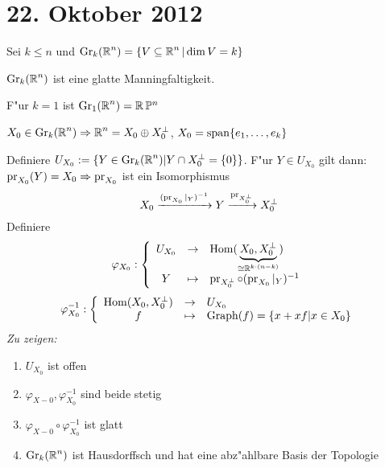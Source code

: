 \section{22. Oktober 2012}
\setcounter{Aufg}{0} %
\setcounter{Loes}{0}

\begin{Dfn*}
Sei $k \le n$ und $\operatorname{Gr}_k(\operatorname{\mathbb{R}}^n) = \{ V \subseteq \operatorname{\mathbb{R}}^n | \operatorname{dim} V = k\}$
\end{Dfn*}

\begin{beh*}
$\operatorname{Gr}_k(\operatorname{\mathbb{R}}^n)$ ist eine glatte Manningfaltigkeit.
\end{beh*}

\begin{Bem*}
F"ur $k = 1$ ist $\operatorname{Gr}_1(\operatorname{\mathbb{R}}^n) = \operatorname{\mathbb{R}} \mathbb{P}^n$
\end{Bem*}

$X_0 \in \operatorname{Gr}_k(\operatorname{\mathbb{R}}^n) \Rightarrow \operatorname{\mathbb{R}}^n = X_0 \oplus X_0^\perp$, $X_0 = \operatorname{span}\{e_1,\ldots ,e_k\}$ 

Definiere $U_{X_0} := \{Y \in \operatorname{Gr}_k(\operatorname{\mathbb{R}}^n) | Y \cap X_0^\perp = \{0\}\}$. F"ur $Y \in U_{X_0}$ gilt dann: $\operatorname{pr}_{X_0}(Y) = X_0 \Rightarrow \operatorname{pr}_{X_0}$ ist ein Isomorphismus
	\[X_0 \xrightarrow{(\operatorname{pr}_{X_0}|_Y)^{-1}} Y \xrightarrow{\operatorname{pr}_{X_0^\perp}} X_0^\perp \]
Definiere
	\[ \varphi_{X_0}: \left\{\begin{array}{ccl} U_{X_0} &\to& \operatorname{Hom}(\underbrace{X_0, X_0^\perp}_{\cong \operatorname{\mathbb{R}}^{k \cdot (n-k)}}) \\
		Y &\mapsto& \operatorname{pr}_{X_0^\perp} \circ (\operatorname{pr}_{X_0}|_Y)^{-1} \end{array}\right.\]
	\[ \varphi_{X_0}^{-1}: \left\{\begin{array}{ccl} \operatorname{Hom}(X_0, X_0^\perp) &\to& U_{X_0} \\
		f &\mapsto& \operatorname{Graph}(f) = \{x + xf | x \in X_0\} \end{array}\right.\]
\emph{Zu zeigen:}\begin{enumerate}
\item
	$U_{X_0}$ ist offen
\item
	$\varphi_{X-0}, \varphi_{X_0}^{-1}$ sind beide stetig
\item
	$\varphi_{X-0} \circ \varphi_{X_0}^{-1}$ ist glatt
\item
	$\operatorname{Gr}_k(\operatorname{\mathbb{R}}^n)$ ist Hausdorffsch und hat eine abz"ahlbare Basis der Topologie
\end{enumerate}

